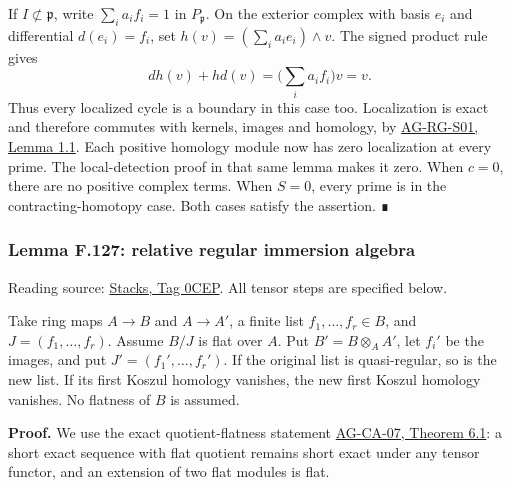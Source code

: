 \documentclass[11pt,a4paper,openany]{report}
\begin{document}
If \(I\not\subset\mathfrak p\), write \(\sum_i a_i f_i=1\) in \(P_{\mathfrak p}\). On the exterior complex with basis \(e_i\) and differential \(d(e_i)=f_i\), set \(h(v)=(\sum_i a_i e_i)\wedge v\). The signed product rule gives \[d h(v)+h d(v)=\Big(\sum_i a_i f_i\Big)v=v.\] Thus every localized cycle is a boundary in this case too. Localization is exact and therefore commutes with kernels, images and homology, by \href{https://github.com/KokunoYumeto/open-math-courses/blob/main/docs/courses/AG-RG/AG-RG-S01.md\#1-the-algebra-of-localization}{AG-RG-S01, Lemma 1.1}. Each positive homology module now has zero localization at every prime. The local-detection proof in that same lemma makes it zero. When \(c=0\), there are no positive complex terms. When \(S=0\), every prime is in the contracting-homotopy case. Both cases satisfy the assertion. ∎

\label{AG-RG-S05-more-algebra-lemma-relative-regular-immersion-algebra}

\subsubsection{Lemma F.127: relative regular immersion algebra}\label{AG-RG-S05-lemma-f.127-relative-regular-immersion-algebra}

Reading source: \href{https://stacks.math.columbia.edu/tag/0CEP}{Stacks, Tag 0CEP}. All tensor steps are specified below.

Take ring maps \(A\to B\) and \(A\to A'\), a finite list \(f_1,\ldots,f_r\in B\), and \(J=(f_1,\ldots,f_r)\). Assume \(B/J\) is flat over \(A\). Put \(B'=B\otimes_A A'\), let \(f_i'\) be the images, and put \(J'=(f_1',\ldots,f_r')\). If the original list is quasi-regular, so is the new list. If its first Koszul homology vanishes, the new first Koszul homology vanishes. No flatness of \(B\) is assumed.

\textbf{Proof.} We use the exact quotient-flatness statement \href{https://github.com/KokunoYumeto/open-math-courses/blob/d02d0a3669f42579db037cd44de1d113fdd770a1/docs/courses/AG-CA/src/tor-and-flat-modules.md}{AG-CA-07, Theorem 6.1}: a short exact sequence with flat quotient remains short exact under any tensor functor, and an extension of two flat modules is flat.
\end{document}
